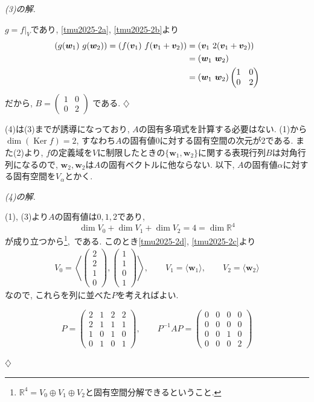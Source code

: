 \documentclass[titlepage]{jsarticle}
\numberwithin{equation}{section}
\newcommand{\R}{\mathbb{R}}%
\newcommand{\Ker}{\operatorname{Ker}}
\newenvironment{kaitou}[1][解]{%
\begin{proofbox}%
\textit{#1. }\ignorespaces
}{%
\hfill$\diamondsuit$%
\end{proofbox}%
}
\begin{document}
\begin{kaitou}[(3)の解]
$g = f|_V$であり, \eqref{tmu2025-2a}, \eqref{tmu2025-2b}より
\begin{align}
\left( g(\bm{w}_1)\,\,g(\bm{w}_2)\right) = \left(f(\bm{v}_1)\,\,f(\bm{v}_1 + \bm{v}_2)\right) &= (\bm{v}_1\,\,2(\bm{v}_1 + \bm{v}_2)) \notag \\ 
&= (\bm{w}_1\,\,\bm{w}_2) \notag \\
&= (\bm{w}_1\,\,\bm{w}_2) \label{tmu2025-2c}
\begin{pmatrix}
1 & 0\\
0 & 2
\end{pmatrix}
\end{align}
だから, $B = \boxed{\begin{pmatrix}
1 & 0\\
0 & 2
\end{pmatrix}}
$
である.
\end{kaitou}
(4)は(3)までが誘導になっており, $A$の固有多項式を計算する必要はない. (1)から$\dim(\Ker f) = 2$, すなわち$A$の固有値$0$に対する固有空間の次元が$2$である. また(2)より, $f$の定義域を$V$に制限したときの$\{\bm{w}_1, \bm{w}_2\}$に関する表現行列$B$は対角行列になるので, $\bm{w}_2, \bm{w}_2$は$A$の固有ベクトルに他ならない. 以下, $A$の固有値$\alpha$に対する固有空間を$V_\alpha$とかく.
\begin{kaitou}[(4)の解]
(1), (3)より$A$の固有値は$0, 1, 2$であり,
\[
\dim V_0 + \dim V_1 + \dim V_2 = 4 = \dim \R^4
\]
が成り立つから\footnote{$\R^4 = V_0 \oplus V_1 \oplus V_2$と固有空間分解できるということ.}, \,である.
このとき\eqref{tmu2025-2d}, \eqref{tmu2025-2c}より
\begin{align*}
V_0 = 
\left\langle
\begin{pmatrix}
2\\
2\\
1\\
0
\end{pmatrix}
,
\begin{pmatrix}
1\\
1\\
0\\
1
\end{pmatrix}
\right\rangle
,\qquad
V_1 = \langle \bm{w}_1\rangle,
\qquad
V_2 = \langle \bm{w}_2 \rangle
\end{align*}
なので, これらを列に並べた$P$を考えればよい. 
\begin{answerbox}
\[
P = 
\begin{pmatrix}
2 & 1 & 2 & 2\\
2 & 1 & 1 & 1\\
1 & 0 & 1 & 0\\
0 & 1 & 0 & 1
\end{pmatrix}
,\qquad
P^{-1}AP = 
\begin{pmatrix}
0 & 0 & 0 & 0\\
0 & 0 & 0 & 0\\
0 & 0 & 1 & 0\\
0 & 0& 0 & 2
\end{pmatrix}
\]
\end{answerbox}
\end{kaitou}
\end{document}
